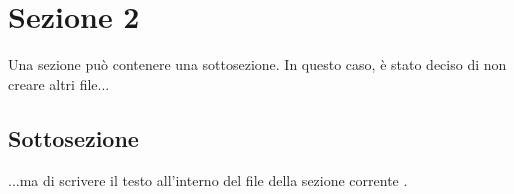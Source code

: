 \section{Sezione 2}
Una sezione può contenere una sottosezione. In questo caso, è stato deciso di non creare altri file... \cite{mori:poesie}

\subsection{Sottosezione}
...ma di scrivere il testo all'interno del file della sezione corrente \cite{Munoz-Lipo}. 